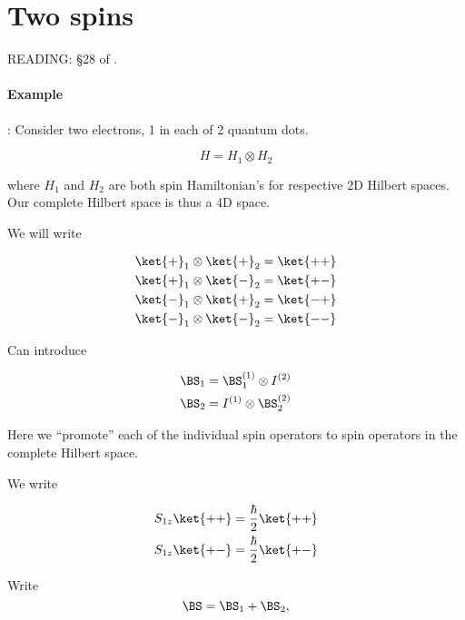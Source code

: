 \section{Two spins}

READING: \S 28 of \citep{desai2009quantum}.

\paragraph{Example}: Consider two electrons, 1 in each of 2 quantum dots.

\begin{equation}\label{eqn:qmTwoL16:190}
H = H_{1} \otimes H_{2}
\end{equation}

where $H_1$ and $H_2$ are both spin Hamiltonian's for respective 2D Hilbert spaces.  Our complete Hilbert space is thus a 4D space.

We will write

\begin{equation}\label{eqn:qmTwoL16:210}
\begin{aligned}
\ket{+}_1 \otimes \ket{+}_2 &= \ket{++} \\
\ket{+}_1 \otimes \ket{-}_2 &= \ket{+-} \\
\ket{-}_1 \otimes \ket{+}_2 &= \ket{-+} \\
\ket{-}_1 \otimes \ket{-}_2 &= \ket{--} 
\end{aligned}
\end{equation}

Can introduce

\begin{align}\label{eqn:qmTwoL16:230}
\BS_1 &= \BS_1^{(1)} \otimes I^{(2)} \\
\BS_2 &= I^{(1)} \otimes \BS_2^{(2)}
\end{align}

Here we ``promote'' each of the individual spin operators to spin operators in the complete Hilbert space.

We write

\begin{align}\label{eqn:qmTwoL16:250}
S_{1z}\ket{++} &= \frac{\hbar}{2} \ket{++} \\
S_{1z}\ket{+-} &= \frac{\hbar}{2} \ket{+-}
\end{align}

Write
\begin{equation}\label{eqn:qmTwoL16:270}
\BS = \BS_1 + \BS_2,
\end{equation}

